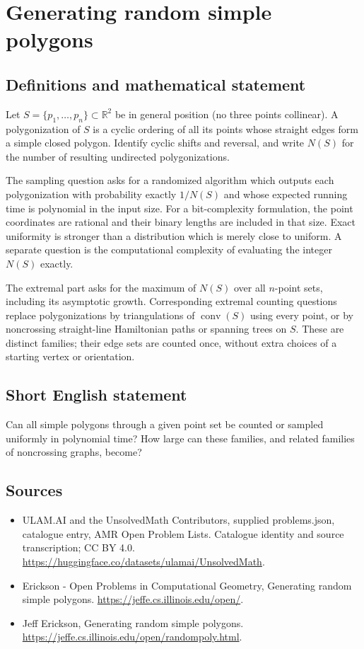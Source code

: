 \documentclass[11pt,a4paper]{article}
\begin{document}
\section*{Generating random simple polygons}\label{statement}

\subsection{Definitions and mathematical statement}
Let $S=\{p_1,\ldots,p_n\}\subset\mathbb R^2$ be in general position
(no three points collinear). A polygonization of $S$ is a cyclic ordering
of all its points whose straight edges form a simple closed polygon.
Identify cyclic shifts and reversal, and write $N(S)$ for the number of
resulting undirected polygonizations.

The sampling question asks for a randomized algorithm which outputs each
polygonization with probability exactly $1/N(S)$ and whose expected
running time is polynomial in the input size. For a bit-complexity
formulation, the point coordinates are rational and their binary lengths
are included in that size. Exact uniformity is stronger than a distribution
which is merely close to uniform. A separate question is the computational
complexity of evaluating the integer $N(S)$ exactly.

The extremal part asks for the maximum of $N(S)$ over all $n$-point sets,
including its asymptotic growth. Corresponding extremal counting questions
replace polygonizations by triangulations of $\operatorname{conv}(S)$ using
every point, or by noncrossing straight-line Hamiltonian paths or spanning
trees on $S$. These are distinct families; their edge sets are counted
once, without extra choices of a starting vertex or orientation.
\subsection{Short English statement}
Can all simple polygons through a given point set be counted or sampled
uniformly in polynomial time? How large can these families, and related
families of noncrossing graphs, become?
\subsection{Sources}
\begin{itemize}
\item[S1] ULAM.AI and the UnsolvedMath Contributors, supplied problems.json, catalogue entry, AMR Open Problem Lists. Catalogue identity and source transcription; CC BY 4.0.
\url{https://huggingface.co/datasets/ulamai/UnsolvedMath}.
\item[S2] Erickson - Open Problems in Computational Geometry, Generating random simple polygons. 
\url{https://jeffe.cs.illinois.edu/open/}.
\item[S3] Jeff Erickson, Generating random simple polygons.
\url{https://jeffe.cs.illinois.edu/open/randompoly.html}.
\end{itemize}
\end{document}
